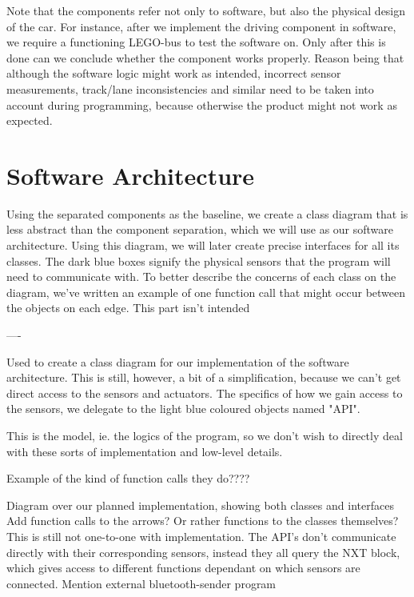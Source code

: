 Note that the components refer not only to software, but also the physical design of the car. For instance, after we implement the driving component in software, we require a functioning LEGO-bus to test the software on. Only after this is done can we conclude whether the component works properly. Reason being that although the software logic might work as intended, incorrect sensor measurements, track/lane inconsistencies and similar need to be taken into account during programming, because otherwise the product might not work as expected.

\section{Software Architecture}
Using the separated components as the baseline, we create a class diagram that is less abstract than the component separation, which we will use as our software architecture. Using this diagram, we will later create precise interfaces for all its classes. The dark blue boxes signify the physical sensors that the program will need to communicate with. To better describe the concerns of each class on the diagram, we've written an example of one function call that might occur between the objects on each edge. This part isn't intended 

----

Used to create a class diagram for our implementation of the software architecture.
This is still, however, a bit of a simplification, because we can't get direct access to the sensors and actuators. 
The specifics of how we gain access to the sensors, we delegate to the light blue coloured objects named "API".

This is the model, ie. the logics of the program, so we don't wish to directly deal with these sorts of implementation and low-level details.


Example of the kind of function calls they do????


Diagram over our planned implementation, showing both classes and interfaces
Add function calls to the arrows? Or rather functions to the classes themselves?
This is still not one-to-one with implementation. The API's don't communicate directly with their corresponding sensors, instead they all query the NXT block, which gives access to different functions dependant on which sensors are connected.
Mention external bluetooth-sender program

